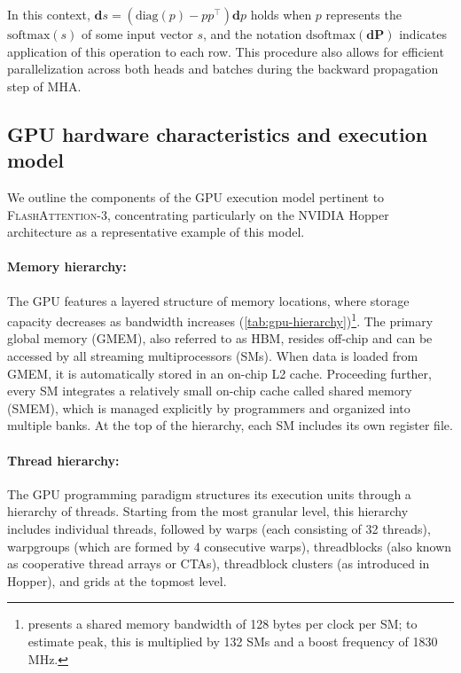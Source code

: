 In this context, $\mathbf{d}s = (\mathrm{diag}(p) - p p^\top)\mathbf{d}p$ holds when $p$ represents the $\mathrm{softmax}(s)$ of some input vector $s$, and the notation $\mathrm{dsoftmax}(\mathbf{dP})$ indicates application of this operation to each row. This procedure also allows for efficient parallelization across both heads and batches during the backward propagation step of MHA.

\subsection{GPU hardware characteristics and execution model}
\label{subsec:hardware}

We outline the components of the GPU execution model pertinent to \textsc{FlashAttention-3}, concentrating particularly on the NVIDIA Hopper architecture as a representative example of this model.

\paragraph{Memory hierarchy:} The GPU features a layered structure of memory locations, where storage capacity decreases as bandwidth increases (\cref{tab:gpu-hierarchy})\footnote{\citet{luo2024benchmarking} presents a shared memory bandwidth of 128 bytes per clock per SM; to estimate peak, this is multiplied by 132 SMs and a boost frequency of 1830 MHz.}. The primary global memory (GMEM), also referred to as HBM, resides off-chip and can be accessed by all streaming multiprocessors (SMs). When data is loaded from GMEM, it is automatically stored in an on-chip L2 cache. Proceeding further, every SM integrates a relatively small on-chip cache called shared memory (SMEM), which is managed explicitly by programmers and organized into multiple banks. At the top of the hierarchy, each SM includes its own register file.

\paragraph{Thread hierarchy:} The GPU programming paradigm structures its execution units through a hierarchy of threads. Starting from the most granular level, this hierarchy includes individual threads, followed by warps (each consisting of 32 threads), warpgroups (which are formed by 4 consecutive warps), threadblocks (also known as cooperative thread arrays or CTAs), threadblock clusters (as introduced in Hopper), and grids at the topmost level.


